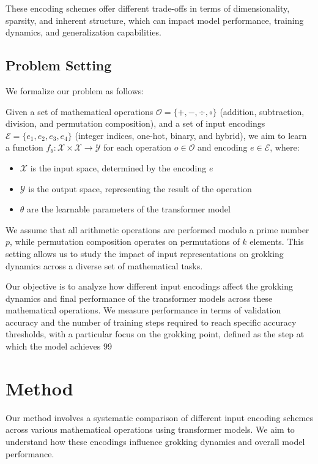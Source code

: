 \documentclass{article} %
\begin{document}
These encoding schemes offer different trade-offs in terms of dimensionality, sparsity, and inherent structure, which can impact model performance, training dynamics, and generalization capabilities.

\subsection{Problem Setting}
We formalize our problem as follows:

Given a set of mathematical operations $\mathcal{O} = \{+, -, \div, \circ\}$ (addition, subtraction, division, and permutation composition), and a set of input encodings $\mathcal{E} = \{e_1, e_2, e_3, e_4\}$ (integer indices, one-hot, binary, and hybrid), we aim to learn a function $f_{\theta}: \mathcal{X} \times \mathcal{X} \rightarrow \mathcal{Y}$ for each operation $o \in \mathcal{O}$ and encoding $e \in \mathcal{E}$, where:

\begin{itemize}
    \item $\mathcal{X}$ is the input space, determined by the encoding $e$
    \item $\mathcal{Y}$ is the output space, representing the result of the operation
    \item $\theta$ are the learnable parameters of the transformer model
\end{itemize}

We assume that all arithmetic operations are performed modulo a prime number $p$, while permutation composition operates on permutations of $k$ elements. This setting allows us to study the impact of input representations on grokking dynamics across a diverse set of mathematical tasks.

Our objective is to analyze how different input encodings affect the grokking dynamics and final performance of the transformer models across these mathematical operations. We measure performance in terms of validation accuracy and the number of training steps required to reach specific accuracy thresholds, with a particular focus on the grokking point, defined as the step at which the model achieves 99%

\section{Method}
\label{sec:method}

Our method involves a systematic comparison of different input encoding schemes across various mathematical operations using transformer models. We aim to understand how these encodings influence grokking dynamics and overall model performance.
\end{document}
